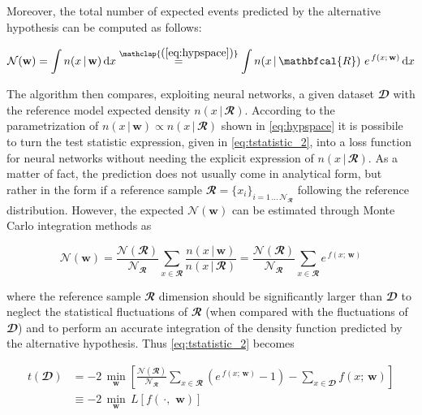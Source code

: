 Moreover, the total number of expected events predicted by the alternative hypothesis can be computed as follows:

\begin{equation}
    \mathcal{N}(\mathbf{w}) = 
    \int  n(x\,|\,\mathbf{w}) \, \text{d}x 
    \stackrel{\mathclap{\normalfont\mbox{(\ref{eq:hypspace})}}}{\,\,\,=\,\,\,}
    \int n(x\,|\,\mathbfcal{R})\,\,e^{\,f(x;\,\mathbf{w})} \, \text{d}x
\end{equation}

The algorithm then compares, exploiting neural networks, a given dataset $\mathbfcal{D}$ with the reference model
expected density $n(x\,|\,\mathbfcal{R})$. According to the parametrization of $n(x\,|\,\mathbf{w}) \propto
n(x\,|\,\mathbfcal{R})$ shown in \autoref{eq:hypspace} it is possibile to turn the test statistic expression, given in
\autoref{eq:tstatistic_2}, into a loss function for neural networks without needing the explicit expression of
$n(x\,|\,\mathbfcal{R})$. As a matter of fact, the prediction does not usually come in analytical form, but rather in
the form if a reference sample $\mathbfcal{R}=\{x_i\}_{i=1\,\ldots\,\mathcal{N}_{\mathbfcal{R}}}$ following the
reference distribution. However, the expected $\mathcal{N}(\mathbf{w})$ can be estimated through Monte Carlo integration
methods as

\begin{equation}
    \mathcal{N}(\mathbf{w}) = 
    \frac{
        \mathcal{N}(\mathbfcal{R})
        }{
            \mathcal{N}_{\mathbfcal{R}}
        }
    \sum_{x \in \mathbfcal{R}}
    \frac{
        n(x\,|\,\mathbf{w})
    }{
        n(x\,|\,\mathbfcal{R})
    } =
    \frac{
        \mathcal{N}(\mathbfcal{R})
    }{
        \mathcal{N}_{\mathbfcal{R}}
    }
    \sum_{x \in \mathbfcal{R}}
    e^{\,f(x;\,\mathbf{w})} 
\end{equation}

\noindent where the reference sample $\mathbfcal{R}$ dimension should be significantly larger than $\mathbfcal{D}$ to
neglect the statistical fluctuations of $\mathbfcal{R}$ (when compared with the fluctuations of $\mathbfcal{D}$) and to
perform an accurate integration of the density function predicted by the alternative hypothesis. Thus
\autoref{eq:tstatistic_2} becomes

\begin{align}
    t(\mathbfcal{D}) & = 
    -2\,\min_{\mathbf{w}} 
    \left[
        \frac{
            \mathcal{N}(\mathbfcal{R})
        }{
            \mathcal{N}_{\mathbfcal{R}}
        }
        \sum_{x \in \mathbfcal{R}}
        \left(
            e^{\,f(x;\,\mathbf{w})} - 1
        \right)
        - \sum_{x \in \mathbfcal{D}}  f(x;\,\mathbf{w})
    \right] \\
    & \equiv -2\,\min_{\mathbf{w}} \, L
    \left[
        f(\,\cdot,\,\,\mathbf{w})
    \right]
\end{align}

